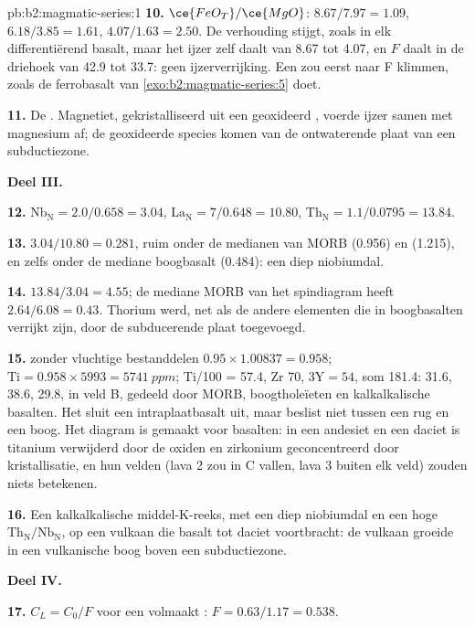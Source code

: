 \begin{solution}{pb:b2:magmatic-series:1}
\textbf{10.} $\ce{FeO_T}/\ce{MgO}$: $8.67/7.97 = 1.09$, $6.18/3.85 = 1.61$, $4.07/1.63 =
2.50$. De verhouding stijgt, zoals in elk differentiërend basalt, maar het ijzer zelf
daalt van 8.67 tot 4.07, en $F$ daalt in de driehoek van 42.9 tot 33.7: geen
ijzerverrijking. Een  zou eerst naar F klimmen, zoals de ferrobasalt van
\cref{exo:b2:magmatic-series:5} doet.

\textbf{11.} De . Magnetiet, gekristalliseerd uit een geoxideerd ,
voerde ijzer samen met magnesium af; de geoxideerde species komen van de ontwaterende plaat van een
subductiezone.

\noindent\textbf{Deel III.}

\textbf{12.} $\mathrm{Nb_N} = 2.0/0.658 = 3.04$, $\mathrm{La_N} = 7/0.648 = 10.80$,
$\mathrm{Th_N} = 1.1/0.0795 = 13.84$.

\textbf{13.} $3.04/10.80 = 0.281$, ruim onder de medianen van MORB (0.956) en
 (1.215), en zelfs onder de mediane boogbasalt (0.484): een diep
niobiumdal.

\textbf{14.} $13.84/3.04 = 4.55$; de mediane MORB van het spindiagram heeft $2.64/6.08 =
0.43$. Thorium werd, net als de andere elementen die in boogbasalten verrijkt zijn, door de
subducerende plaat toegevoegd.

\textbf{15.}  zonder vluchtige bestanddelen $0.95\times1.00837 = 0.958$; $\mathrm{Ti} =
0.958\times5993 = \qty{5741}{ppm}$; Ti/100 = 57.4, Zr 70, $3\mathrm Y = 54$, som 181.4:
31.6, 38.6, 29.8, in veld B, gedeeld door MORB, boogtholeïeten en kalkalkalische basalten.
Het sluit een intraplaatbasalt uit, maar beslist niet tussen een rug en een boog. Het
diagram is gemaakt voor basalten: in een andesiet en een daciet is titanium verwijderd
door de oxiden en zirkonium geconcentreerd door kristallisatie, en hun velden (lava 2
zou in C vallen, lava 3 buiten elk veld) zouden niets betekenen.

\textbf{16.} Een kalkalkalische middel-K-reeks, met een diep niobiumdal en een hoge
$\mathrm{Th_N}/\mathrm{Nb_N}$, op een vulkaan die basalt tot daciet voortbracht: de vulkaan
groeide in een vulkanische boog boven een subductiezone.

\noindent\textbf{Deel IV.}

\textbf{17.} $C_L = C_0/F$ voor een volmaakt : $F = 0.63/1.17 =
0.538$.


\end{solution}
